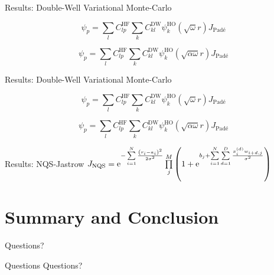 \documentclass[10pt, t]{beamer}
\newcommand{\twofigure}[2]{
    \begin{figure}[H]
        \centering
        \begin{subfigure}[b!]{0.49\textwidth}
            \centering
            \texttt{[image: \{\#1]}}
        \end{subfigure}
        \begin{subfigure}[b!]{0.49\textwidth}
            \centering
            \texttt{[image: \{\#2]}}
        \end{subfigure}
        \justify
    \end{figure}
} %
\begin{document}
\begin{frame}[fragile]{Results: Double-Well Variational Monte-Carlo}
    
    \begin{equation*}
        \psi_p =
        \sum_lC^{\text{HF}}_{lp}\sum_kC^{\text{DW}}_{kl}\psi^{\text{HO}}_k\left(\sqrt{\omega}r\right)J_{\text{Pad\'e}}
    \end{equation*}
    
    \begin{equation*}
        \psi_p =
        \sum_lC^{\text{HF}}_{lp}\sum_kC^{\text{DW}}_{kl}\psi^{\text{HO}}_k\left(\sqrt{\alpha\omega}r\right)J_{\text{Pad\'e}}
    \end{equation*}
\end{frame}

\begin{frame}[fragile]{Results: Double-Well Variational Monte-Carlo}
    
    \begin{equation*}
        \psi_p =
        \sum_lC^{\text{HF}}_{lp}\sum_kC^{\text{DW}}_{kl}\psi^{\text{HO}}_k\left(\sqrt{\omega}r\right)J_{\text{Pad\'e}}
    \end{equation*}
    
    \begin{equation*}
        \psi_p =
        \sum_lC^{\text{HF}}_{lp}\sum_kC^{\text{DW}}_{kl}\psi^{\text{HO}}_k\left(\sqrt{\alpha\omega}r\right)J_{\text{Pad\'e}}
    \end{equation*}
\end{frame}

{
\begin{frame}[standout]{Results: NQS-Jastrow}
    $J_{\text{NQS}} = \me^{-\suml{i=1}{N} \frac{\left({r}_i -
    {a}_i\right)^2}{2\sigma^2}}\prod\limits^{M}_j \left(1 + \me^{b_j +
    \suml{i=1}{N}\suml{d=1}{D} \frac{x^{(d)}_iw_{i+d,j}}{\sigma^2}}\right)$
\end{frame}}


\section{Summary and Conclusion}

{
\begin{frame}[standout]
  Questions?
\end{frame}}

\appendix

{
\begin{frame}[standout]{Questions}
    Questions?
\end{frame}}
\end{document}
